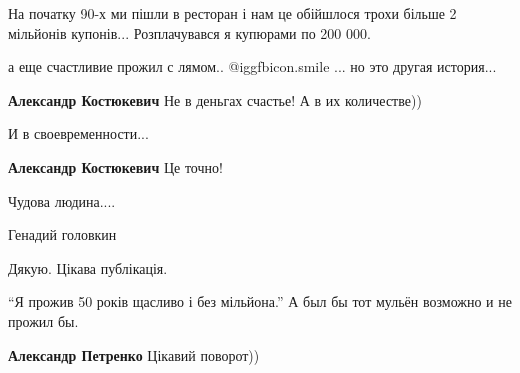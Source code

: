 \begin{itemize}
\begin{itemize}
На початку 90-х ми пішли в ресторан і нам це обійшлося трохи більше 2 мільйонів
купонів... Розплачувався я купюрами по 200 000.

а еще счастливие прожил с лямом.. @igg{fbicon.smile} ... но это другая история...

\begin{itemize} %
\textbf{Александр Костюкевич} Не в деньгах счастье! А в их количестве))

И в своевременности...

\textbf{Александр Костюкевич} Це точно!

\end{itemize} %

\end{itemize} %

Чудова людина....

Генадий головкин

Дякую. Цікава публікація.

\enquote{Я прожив 50 років щасливо і без мільйона.} А был бы тот мульён возможно и не прожил бы.

\textbf{Александр Петренко} Цікавий поворот))

\end{itemize} %
